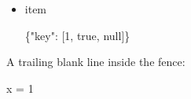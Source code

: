 \documentclass[
]{article}
\newenvironment{Shaded}{}{}
\newcommand{\ConstantTok}[1]{\textcolor[rgb]{0.53,0.00,0.00}{#1}}
\newcommand{\DecValTok}[1]{\textcolor[rgb]{0.25,0.63,0.44}{#1}}
\newcommand{\NormalTok}[1]{#1}
\newcommand{\OperatorTok}[1]{\textcolor[rgb]{0.40,0.40,0.40}{#1}}
\newcommand{\StringTok}[1]{\textcolor[rgb]{0.25,0.44,0.63}{#1}}
\begin{document}
\begin{itemize}
\item
  item

\begin{Shaded}
\begin{Highlighting}[]
\NormalTok{\{}\StringTok{"key"}\NormalTok{: [}\DecValTok{1}\NormalTok{, }\ConstantTok{true}\NormalTok{, }\ConstantTok{null}\NormalTok{]\}}
\end{Highlighting}
\end{Shaded}
\end{itemize}

A trailing blank line inside the fence:

\begin{Shaded}
\begin{Highlighting}[]
\NormalTok{x }\OperatorTok{=} \DecValTok{1}
\end{Highlighting}
\end{Shaded}
\end{document}
